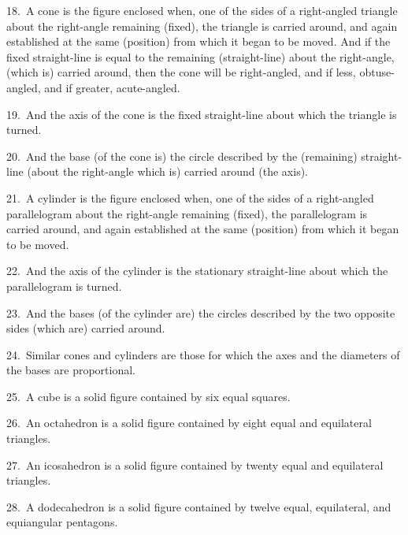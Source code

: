 \begin{Parallel}{}{}
{18.~A cone is the figure enclosed when,  one of the sides of a right-angled triangle about the right-angle remaining (fixed),
  the triangle is carried around, and again established at the
 same (position) from which it began to be moved. And if the
 fixed straight-line is equal to the remaining (straight-line) about the
 right-angle, (which is) carried around, then the cone will be right-angled, and
 if less, obtuse-angled, and if greater, acute-angled.
 
19.~And the axis of the cone is the fixed straight-line about which
 the triangle is turned.
 
20.~And the base (of the cone is) the circle described by the (remaining) straight-line (about the right-angle which is)
 carried around (the axis).
 
21.~A cylinder is the figure enclosed when, one of the sides
 of a right-angled parallelogram about the right-angle remaining (fixed),
 the parallelogram is carried around, and again established at the same
 (position) from which it began to be moved.
 
22.~And the axis of the cylinder is the stationary straight-line about which
 the parallelogram is turned.
 
23.~And the bases (of the cylinder are) the circles described by the
 two opposite sides (which are) carried around.
 
24.~Similar cones and cylinders are those for which the axes and the diameters
 of the bases are proportional.
 
25.~A cube is a solid figure contained by six equal squares.

26.~An octahedron is a solid figure contained by eight equal and
 equilateral triangles.
 
 27.~An icosahedron is a solid figure contained by twenty equal and
 equilateral triangles.
 
28.~A dodecahedron is a solid figure contained by twelve equal,
 equilateral, and equiangular pentagons.}
 \end{Parallel}
 
